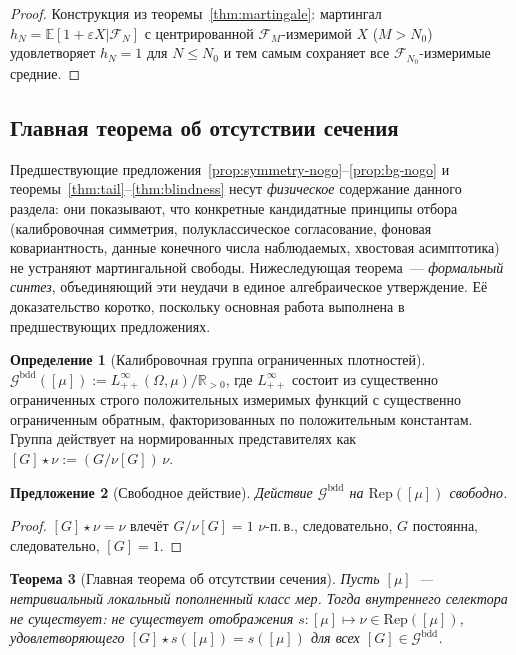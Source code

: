 \documentclass[12pt,a4paper]{article}
\theoremstyle{plain}
\newtheorem{theorem}{Теорема}[section]
\newtheorem{proposition}[theorem]{Предложение}
\theoremstyle{definition}
\newtheorem{definition}[theorem]{Определение}
\theoremstyle{remark}
\newcommand{\cF}{\mathcal{F}}
\newcommand{\cG}{\mathcal{G}}
\newcommand{\E}{\mathbb{E}}
\newcommand{\R}{\mathbb{R}}
\newcommand{\Rep}{\mathrm{Rep}}
\begin{document}
\begin{proof}
Конструкция из теоремы~\ref{thm:martingale}: мартингал
$h_N = \E[1+\varepsilon X|\cF_N]$ с центрированной
$\cF_M$-измеримой $X$ ($M > N_0$) удовлетворяет $h_N = 1$
для $N \le N_0$ и тем самым сохраняет все
$\cF_{N_0}$-измеримые средние.
\end{proof}

\subsection{Главная теорема об отсутствии сечения}

Предшествующие предложения~\ref{prop:symmetry-nogo}--\ref{prop:bg-nogo}
и теоремы~\ref{thm:tail}--\ref{thm:blindness} несут
\emph{физическое} содержание данного раздела: они показывают,
что конкретные кандидатные принципы отбора (калибровочная симметрия,
полуклассическое согласование, фоновая ковариантность, данные
конечного числа наблюдаемых, хвостовая асимптотика) не устраняют
мартингальной свободы.  Нижеследующая теорема~--- \emph{формальный
синтез}, объединяющий эти неудачи в единое алгебраическое
утверждение.  Её доказательство коротко, поскольку основная работа
выполнена в предшествующих предложениях.

\begin{definition}[Калибровочная группа ограниченных плотностей]
\label{def:gauge-group}
$\cG^{\mathrm{bdd}}([\mu]) :=
L^\infty_{++}(\Omega,\mu)/\R_{>0}$, где $L^\infty_{++}$
состоит из существенно ограниченных строго положительных
измеримых функций с существенно ограниченным обратным, факторизованных
по положительным константам.  Группа действует на нормированных
представителях как $[G] \star \nu := (G/\nu[G])\,\nu$.
\end{definition}

\begin{proposition}[Свободное действие]
\label{prop:free-action}
Действие $\cG^{\mathrm{bdd}}$ на $\Rep([\mu])$ свободно.
\end{proposition}

\begin{proof}
$[G]\star\nu = \nu$ влечёт $G/\nu[G] = 1$ $\nu$-п.\,в.,
следовательно, $G$ постоянна, следовательно, $[G] = 1$.
\end{proof}

\begin{theorem}[Главная теорема об отсутствии сечения]
\label{thm:no-section}
Пусть $[\mu]$~--- нетривиальный локальный пополненный класс мер.
Тогда \emph{внутреннего селектора} не существует: не существует
отображения $s\colon [\mu] \mapsto \nu \in \Rep([\mu])$,
удовлетворяющего $[G]\star s([\mu]) = s([\mu])$ для всех
$[G] \in \cG^{\mathrm{bdd}}$.
\end{theorem}
\end{document}
